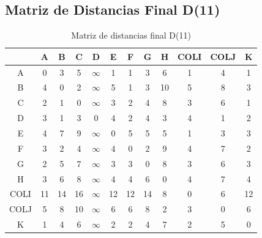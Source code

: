 \documentclass[12pt]{article}
\begin{document}
\subsection{Matriz de Distancias Final D(11)}
\begin{table}[h!]
\centering
\begin{tabular}{|c|c|c|c|c|c|c|c|c|c|c|c|}
\hline
 & A & B & C & D & E & F & G & H & COLI & COLJ & K \\\hline
A & 0 & 3 & 5 & $\infty$ & 1 & 1 & 3 & 6 & 1 & 4 & 1 \\\hline
B & 4 & 0 & 2 & $\infty$ & 5 & 1 & 3 & 10 & 5 & 8 & 3 \\\hline
C & 2 & 1 & 0 & $\infty$ & 3 & 2 & 4 & 8 & 3 & 6 & 1 \\\hline
D & 3 & 1 & 3 & 0 & 4 & 2 & 4 & 3 & 4 & 1 & 2 \\\hline
E & 4 & 7 & 9 & $\infty$ & 0 & 5 & 5 & 5 & 1 & 3 & 3 \\\hline
F & 3 & 2 & 4 & $\infty$ & 4 & 0 & 2 & 9 & 4 & 7 & 2 \\\hline
G & 2 & 5 & 7 & $\infty$ & 3 & 3 & 0 & 8 & 3 & 6 & 3 \\\hline
H & 3 & 6 & 8 & $\infty$ & 4 & 4 & 6 & 0 & 4 & 7 & 4 \\\hline
COLI & 11 & 14 & 16 & $\infty$ & 12 & 12 & 14 & 8 & 0 & 6 & 12 \\\hline
COLJ & 5 & 8 & 10 & $\infty$ & 6 & 6 & 8 & 2 & 3 & 0 & 6 \\\hline
K & 1 & 4 & 6 & $\infty$ & 2 & 2 & 4 & 7 & 2 & 5 & 0 \\\hline
\end{tabular}
\caption{Matriz de distancias final D(11)}
\end{table}

\clearpage
\end{document}

